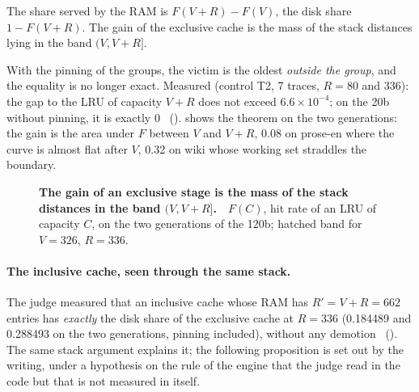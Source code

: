 \begin{corollaire}\label{t3mim:cor:bande}
The share served by the RAM is $F(V+R) - F(V)$, the disk share $1 - F(V+R)$. The gain of the exclusive cache is the mass of the stack distances lying in the band $(V, V+R]$.
\end{corollaire}

With the pinning of the groups, the victim is the oldest \emph{outside the group}, and the equality is no longer exact. Measured (control T2, 7 traces, $R = 80$ and 336): the gap to the LRU of capacity $V+R$ does not exceed $6.6 \times 10^{-4}$; on the 20b without pinning, it is exactly 0 \mes~().  shows the theorem on the two generations: the gain is the area under $F$ between $V$ and $V+R$, 0.08 on prose-en where the curve is almost flat after $V$, 0.32 on wiki whose working set straddles the boundary.

\begin{figure}[tbp]
\centering
{}
\caption[P2: the stack distances and the band $(V, V+R\rbrack$]{\textbf{The gain of an exclusive stage is the mass of the stack distances in the band $(V, V+R]$.} \mes\,\calc~$F(C)$, hit rate of an LRU of capacity $C$, on the two generations of the 120b; hatched band for $V = 326$, $R = 336$. \HorsStyle{}}
\label{fig:t3-mim-p2-pile}
\end{figure}

\paragraph{The inclusive cache, seen through the same stack.} The judge measured that an inclusive cache whose RAM has $R' = V + R = 662$ entries has \emph{exactly} the disk share of the exclusive cache at $R = 336$ (0.184489 and 0.288493 on the two generations, pinning included), without any demotion \mes~(). The same stack argument explains it; the following proposition is set out by the writing, under a hypothesis on the rule of the engine that the judge read in the code but that is not measured in itself.

